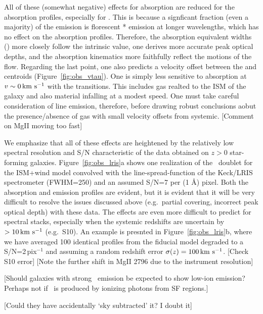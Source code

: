 \documentclass[12pt,preprint]{aastex}
\begin{document}
All of these (somewhat negative) effects for  absorption are reduced
for the  absorption profiles, especially for \feiia.  This
is because a signficant fraction (even a majority) of the
 emission is florescent * emission at longer
wavelengths, which has no effect on the absorption profiles. 
Therefore, the  absorption equivalent widths (\ewabs) more
closely follow the intrinsic value, one derives more accurate peak
optical depths, and the absorption kinematics more faithfully reflect
the motions of the flow.  Regarding the last point, one also
predicts a velocity offset between the  and 
centroids (Figure~\ref{fig:obs_vtau}).
One is simply
less sensitive to absorption at $v \sim 0 \, {\rm km~s^{-1}}$ with the 
transitions.  This includes gas realted to the ISM of the galaxy and
also material infalling at a modest speed.  One must take careful
consideration of line emission, therefore,  before drawing robust
conclusions aobut the presence/absence of gas with small velocity
offsets from systemic. [Comment on MgII moving too fast]

We emphasize that all of these effects are heightened by the
relatively low spectral resolution and S/N characteristic of the data
obtained on $z>0$ star-forming galaxies.  Figure~\ref{fig:obs_lris}a
shows one realization of the \mgiid\ doublet for the ISM+wind model
convolved with the line-spread-function of the Keck/LRIS spectrometer
(FWHM=250\kms) and an assumed S/N=7 per (1 \AA) pixel.  Both the absorption
and emission profiles are evident, but it is evident that it will be
very difficult to resolve the issues discussed above (e.g.\ partial
covering, incorrect peak optical depth) with these data.  The effects
are even more difficult to predict for spectral stacks, especially
when the systemic redshifts are uncertain by $> 10 \, {\rm km~s^{-1}}$ (e.g.\ S10).
An example is presnted in Figure~\ref{fig:obs_lris}b, where we have
averaged 100 identical  profiles from the fiducial model
degraded to a S/N=2\,pix$^{-1}$ and assuming a random redshift error
$\sigma(z) = 100\, {\rm km~s^{-1}}$.  [Check S10 error] [Note the further shift in
MgII 2796 due to the instrument resolution]

[Should galaxies with strong \lya\ emission be expected to show
low-ion emission? Perhaps not if \lya\ is produced by ionizing photons
from SF regions.]

[Could they have accidentally `sky subtracted' it?  I doubt it]
\end{document}
